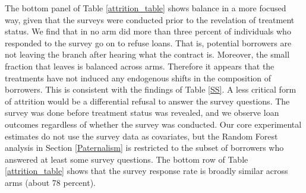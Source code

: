 \documentclass[oneside,11pt]{article}
\begin{document}
The bottom panel of Table \ref{attrition_table} shows balance in a more focused way, given that the surveys were conducted prior to the revelation of treatment status. We find that in no arm did more than three percent of individuals who responded to the survey go on to refuse loans. That is, potential borrowers are not leaving the branch after hearing what the contract is. Moreover, the small fraction that leaves is balanced across arms.  Therefore it appears that the treatments have not induced any endogenous shifts in the composition of borrowers. This is consistent with the findings of Table \ref{SS}.
A less critical form of attrition would be a differential refusal to answer the survey questions.  The survey was done before treatment status was revealed, and we observe loan outcomes regardless of whether the survey was conducted.  Our core experimental estimates do not use the survey data as covariates, but the Random Forest analysis in Section \ref{Paternalism} is restricted to the subset of borrowers who answered at least some survey questions. The bottom row of Table \ref{attrition_table} shows that the survey response rate is broadly similar across arms (about 78 percent). 
\end{document}
